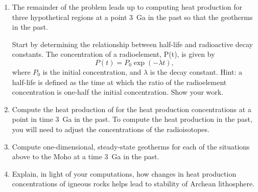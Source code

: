 \begin{enumerate}
        If you enter the equations correctly into the first empty heat flow and
        temperature cells, you should be able to copy them to the end of each
        column.  With the appropriate \$ on cell columns/rows, you will also be
        able to copy the heat flow and temperature columns from the first
        scenario to all others.

    \item The remainder of the problem leads up to computing heat production for
        three hypothetical regions at a point \SI{3}{Ga} in the past so that the
        geotherms in the past.

        Start by determining the relationship between half-life and radioactive
        decay constants.  The concentration of a radioelement, P(t), is given by
        \begin{equation}
            P(t) = P_0 \exp (-\lambda t),
        \end{equation}
        where $P_0$ is the initial concentration, and $\lambda$ is the decay
        constant.  Hint: a half-life is defined as the time at which the ratio
        of the radioelement concentration is one-half the initial concentration.
        Show your work.

    \item Compute the heat production of for the heat production concentrations
        at a point in time \SI{3}{Ga} in the past.  To compute the heat production in
        the past, you will need to adjust the concentrations of the
        radioisotopes.

    \item Compute one-dimensional, steady-state geotherms for each of the
        situations above to the Moho at a time \SI{3}{Ga} in the past.

    \item Explain, in light of your computations, how changes in heat production
        concentrations of igneous rocks helps lead to stability of Archean
        lithosphere.
\end{enumerate}
\FloatBarrier
